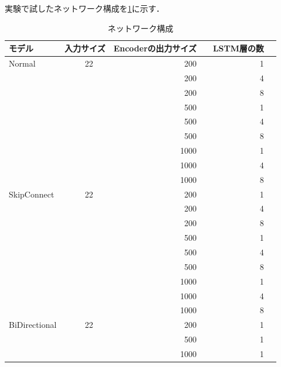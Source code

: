 \documentclass[a4j,11pt,report]{jsbook}
\begin{document}
実験で試したネットワーク構成を\ref{tb:network_collection}に示す．

\begin{table}[H]
  \centering
  \caption{ネットワーク構成}
  \begin{tabular}{|l|c|r|r|r|} \hline
    モデル & 入力サイズ & Encoderの出力サイズ &　LSTM層の数 \\ \hline \hline
    Normal&　22       & 200              &      1 \\
    &　         & 200              &      4 \\
    &　         & 200              &      8 \\
    &　         & 500              &      1 \\
    &　         & 500              &      4 \\
    &　         & 500              &      8 \\
    &　         & 1000             &      1 \\
    &　         & 1000             &      4 \\
    &　         & 1000             &      8 \\ \hline \hline
    SkipConnect&　22       & 200              &      1 \\
    &　         & 200              &      4 \\
    &　         & 200              &      8 \\
    &　         & 500              &      1 \\
    &　         & 500              &      4 \\
    &　         & 500              &      8 \\
    &　         & 1000             &      1 \\
    &　         & 1000             &      4 \\
    &　         & 1000             &      8 \\ \hline \hline
    BiDirectional&　22       & 200 &      1 \\
    &　         & 500              &      1 \\
    &　         & 1000             &      1 \\ \hline
  \end{tabular}
  \label{tb:network_collection}

\end{table}
\end{document}
